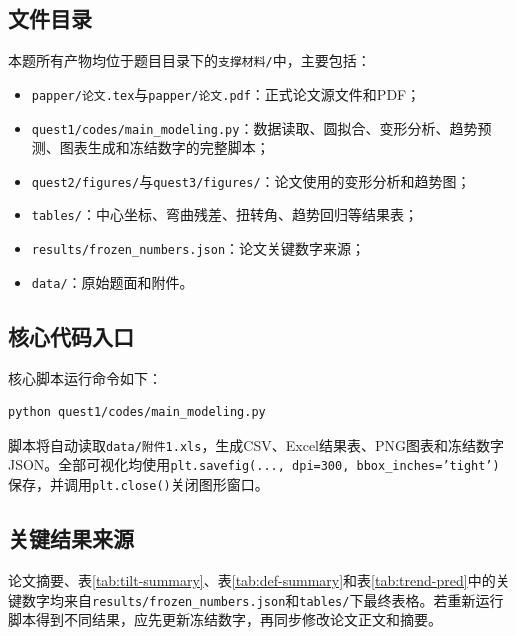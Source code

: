 \documentclass[UTF8,a4paper,12pt]{ctexart}
\begin{document}
\subsection{文件目录}
本题所有产物均位于题目目录下的\texttt{支撑材料/}中，主要包括：
\begin{itemize}
    \item \texttt{papper/论文.tex}与\texttt{papper/论文.pdf}：正式论文源文件和PDF；
    \item \texttt{quest1/codes/main\_modeling.py}：数据读取、圆拟合、变形分析、趋势预测、图表生成和冻结数字的完整脚本；
    \item \texttt{quest2/figures/}与\texttt{quest3/figures/}：论文使用的变形分析和趋势图；
    \item \texttt{tables/}：中心坐标、弯曲残差、扭转角、趋势回归等结果表；
    \item \texttt{results/frozen\_numbers.json}：论文关键数字来源；
    \item \texttt{data/}：原始题面和附件。
\end{itemize}

\subsection{核心代码入口}
核心脚本运行命令如下：
\begin{verbatim}
python quest1/codes/main_modeling.py
\end{verbatim}
脚本将自动读取\texttt{data/附件1.xls}，生成CSV、Excel结果表、PNG图表和冻结数字JSON。全部可视化均使用\texttt{plt.savefig(..., dpi=300, bbox\_inches='tight')}保存，并调用\texttt{plt.close()}关闭图形窗口。

\subsection{关键结果来源}
论文摘要、表\ref{tab:tilt-summary}、表\ref{tab:def-summary}和表\ref{tab:trend-pred}中的关键数字均来自\texttt{results/frozen\_numbers.json}和\texttt{tables/}下最终表格。若重新运行脚本得到不同结果，应先更新冻结数字，再同步修改论文正文和摘要。
\end{document}
